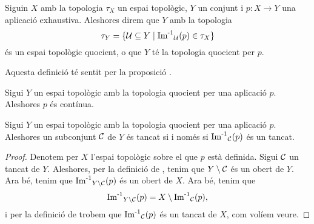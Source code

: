 \documentclass[../Apunts.tex]{subfiles}
\begin{document}
	\begin{definition}
		\label{def:topologia quocient}
		Siguin \(X\) amb la topologia \(\tau_{X}\) un espai topològic, \(Y\) un conjunt i \(p\colon X\longrightarrow Y\) una aplicació exhaustiva. Aleshores direm que \(Y\) amb la topologia
		\[\tau_{Y}=\{\mathcal{U}\subseteq Y\mid\operatorname{\operatorname{Im}^{-1}}_{\mathcal{U}}(p)\in\tau_{X}\}\]
		és un espai topològic quocient, o que \(Y\) té la topologia quocient per \(p\).
		
		Aquesta definició té sentit per la proposició .
	\end{definition}
	\begin{observation}
		\label{obs:l'aplicació que indueix la topologia en un espai quocient és contínua}
		Sigui \(Y\) un espai topològic amb la topologia quocient per una aplicació \(p\). Aleshores \(p\) és contínua.
	\end{observation} %
	\begin{proposition}
		\label{prop:la topologia quocient és equivalent per tancats}
		Sigui \(Y\) un espai topològic amb la topologia quocient per una aplicació \(p\). Aleshores un subconjunt \(\mathcal{C}\) de \(Y\) és tancat si i només si \(\operatorname{\operatorname{Im}^{-1}}_{\mathcal{C}}(p)\) és un tancat.
		\begin{proof} %
			Denotem per \(X\) l'espai topològic sobre el que \(p\) està definida. Sigui \(\mathcal{C}\) un tancat de \(Y\). Aleshores, per la definició de , tenim que \(Y\setminus\mathcal{C}\) és un obert de \(Y\). Ara bé, tenim que \(\operatorname{\operatorname{Im}^{-1}}_{Y\setminus\mathcal{C}}(p)\) és un obert de \(X\). Ara bé, tenim que
			\[\operatorname{\operatorname{Im}^{-1}}_{Y\setminus\mathcal{C}}(p)=X\setminus\operatorname{\operatorname{Im}^{-1}}_{\mathcal{C}}(p),\]
			i per la definició de  trobem que \(\operatorname{\operatorname{Im}^{-1}}_{\mathcal{C}}(p)\) és un tancat de \(X\), com volíem veure.
		\end{proof}
	\end{proposition}
\end{document}

